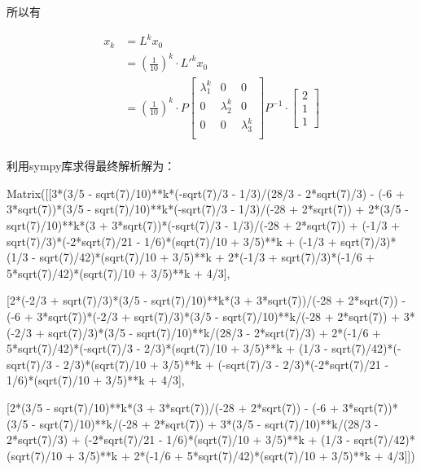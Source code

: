 所以有

\begin{equation}
    \begin{split}
        x_k &= L^k x_0\\
        &= (\frac{1}{10})^k · L'^{k} x_0\\
        &= (\frac{1}{10})^k · P\begin{bmatrix}
            \lambda_1^k & 0 & 0\\
            0 & \lambda_2^k & 0\\
            0 & 0 & \lambda_3^k\\
        \end{bmatrix} P^{-1} · \begin{bmatrix}
            2\\1\\1
        \end{bmatrix}\\
    \end{split}
\end{equation}

利用sympy库求得最终解析解为：
\begin{python}
Matrix([[3*(3/5 - sqrt(7)/10)**k*(-sqrt(7)/3 - 1/3)/(28/3 - 2*sqrt(7)/3) - 
(-6 + 3*sqrt(7))*(3/5 - sqrt(7)/10)**k*(-sqrt(7)/3 - 1/3)/(-28 + 2*sqrt(7)) +
 2*(3/5 - sqrt(7)/10)**k*(3 + 3*sqrt(7))*(-sqrt(7)/3 - 1/3)/(-28 + 2*sqrt(7)) + 
 (-1/3 + sqrt(7)/3)*(-2*sqrt(7)/21 - 1/6)*(sqrt(7)/10 + 3/5)**k + 
 (-1/3 + sqrt(7)/3)*(1/3 - sqrt(7)/42)*(sqrt(7)/10 + 3/5)**k + 
 2*(-1/3 + sqrt(7)/3)*(-1/6 + 5*sqrt(7)/42)*(sqrt(7)/10 + 3/5)**k + 4/3],
 
  [2*(-2/3 + sqrt(7)/3)*(3/5 - sqrt(7)/10)**k*(3 + 3*sqrt(7))/(-28 + 2*sqrt(7)) -
   (-6 + 3*sqrt(7))*(-2/3 + sqrt(7)/3)*(3/5 - sqrt(7)/10)**k/(-28 + 2*sqrt(7)) + 
   3*(-2/3 + sqrt(7)/3)*(3/5 - sqrt(7)/10)**k/(28/3 - 2*sqrt(7)/3) + 
   2*(-1/6 + 5*sqrt(7)/42)*(-sqrt(7)/3 - 2/3)*(sqrt(7)/10 + 3/5)**k + 
   (1/3 - sqrt(7)/42)*(-sqrt(7)/3 - 2/3)*(sqrt(7)/10 + 3/5)**k + 
   (-sqrt(7)/3 - 2/3)*(-2*sqrt(7)/21 - 1/6)*(sqrt(7)/10 + 3/5)**k + 4/3], 
   
   [2*(3/5 - sqrt(7)/10)**k*(3 + 3*sqrt(7))/(-28 + 2*sqrt(7)) - 
   (-6 + 3*sqrt(7))*(3/5 - sqrt(7)/10)**k/(-28 + 2*sqrt(7)) +
    3*(3/5 - sqrt(7)/10)**k/(28/3 - 2*sqrt(7)/3) + 
    (-2*sqrt(7)/21 - 1/6)*(sqrt(7)/10 + 3/5)**k + (1/3 - sqrt(7)/42)*(sqrt(7)/10 + 3/5)**k + 
    2*(-1/6 + 5*sqrt(7)/42)*(sqrt(7)/10 + 3/5)**k + 4/3]])
\end{python}

